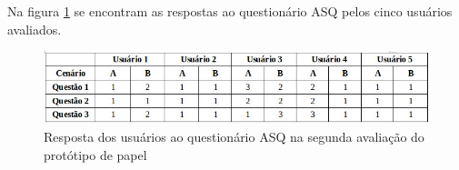   
  
  Na figura \ref{resposta_asq_2iteracao} se encontram as respostas ao questionário ASQ pelos cinco usuários avaliados.

  
  
  \begin{figure}[!htb]
  \centering
  \includegraphics[scale=0.6]{figuras/nota2avaliacao.jpg}
  \caption{Resposta dos usuários ao questionário ASQ na segunda avaliação do protótipo de papel}
  \label{resposta_asq_2iteracao}
  \end{figure}